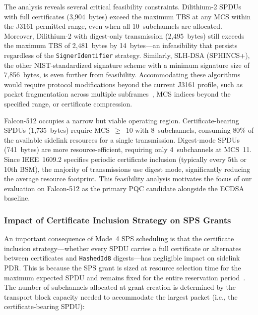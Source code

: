 \documentclass[letterpaper,journal]{IEEEtran}
\begin{document}
The analysis reveals several critical feasibility constraints. Dilithium-2 SPDUs with full certificates (3{,}904~bytes) exceed the maximum TBS at any MCS within the J3161-permitted range, even when all 10~subchannels are allocated. Moreover, Dilithium-2 with digest-only transmission (2{,}495~bytes) still exceeds the maximum TBS of 2{,}481~bytes by 14~bytes---an infeasibility that persists regardless of the \texttt{SignerIdentifier} strategy. Similarly, SLH-DSA (SPHINCS+), the other NIST-standardized signature scheme with a minimum signature size of 7{,}856~bytes, is even further from feasibility. Accommodating these algorithms would require protocol modifications beyond the current J3161 profile, such as packet fragmentation across multiple subframes~\cite{twardokus2025chasm}, MCS indices beyond the specified range, or certificate compression.

Falcon-512 occupies a narrow but viable operating region. Certificate-bearing SPDUs (1{,}735~bytes) require MCS~$\geq$~10 with 8~subchannels, consuming 80\% of the available sidelink resources for a single transmission. Digest-mode SPDUs (741~bytes) are more resource-efficient, requiring only 4~subchannels at MCS~11. Since IEEE~1609.2 specifies periodic certificate inclusion (typically every 5th or 10th BSM), the majority of transmissions use digest mode, significantly reducing the average resource footprint. This feasibility analysis motivates the focus of our evaluation on Falcon-512 as the primary PQC candidate alongside the ECDSA baseline.

\subsubsection{Impact of Certificate Inclusion Strategy on SPS Grants}

An important consequence of Mode~4 SPS scheduling is that the certificate inclusion strategy---whether every SPDU carries a full certificate or alternates between certificates and \texttt{HashedId8} digests---has negligible impact on sidelink PDR. This is because the SPS grant is sized at resource selection time for the maximum expected SPDU and remains fixed for the entire reservation period~\cite{3gpp_36321}. The number of subchannels allocated at grant creation is determined by the transport block capacity needed to accommodate the largest packet (i.e., the certificate-bearing SPDU):
\end{document}
